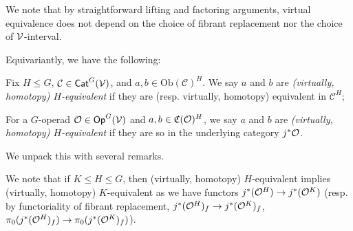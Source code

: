 \documentclass[a4paper,10pt
,draft
]{article}%
\renewcommand{\1}{\eta}%
\begin{document}
\begin{remark}
      \label{VE_CHOICE_REM}
      We note that by straightforward lifting and factoring arguments,
      virtual equivalence does not depend on the choice of fibrant replacement nor the choice of $\mathcal V$-interval.
\end{remark}

Equivariantly, we have the following:
\begin{definition}
      \label{EQUIVG_DEF}
      Fix $H \leq G$, $\mathcal{C}\in \mathsf{Cat}^G(\mathcal V)$, and $a,b\in \mathrm{Ob}(\mathcal{C})^H$.
      We say $a$ and $b$ are 
      \textit{(virtually, homotopy) $H$-equivalent}
      if they are (resp. virtually, homotopy) equivalent in $\mathcal{C}^H$;
      
      For a $G$-operad $\mathcal{O}\in \mathsf{Op}^G(\mathcal V)$ and $a,b\in \mathfrak C(\mathcal{O})^H$, we say $a$ and $b$ are
      {\em (virtually, homotopy) $H$-equivalent}
      if they are so in the underlying category $j^*\mathcal{O}$. 
\end{definition}

We unpack this with several remarks.

\begin{remark}
      \label{HK_EQUIV_REM}
      We note that if $K \leq H \leq G$, then (virtually, homotopy) $H$-equivalent implies (virtually, homotopy) $K$-equivalent
      as we have functors
      $j^{\**}(\O^H) \to j^{\**}(\O^K)$
      (resp. by functoriality of fibrant replacement,
      $j^{\**}(\O^H)_f \to j^{\**}(\O^K)_f$,
      $\pi_0(j^{\**}(\O^H)_f) \to \pi_0(j^{\**}(\O^K)_f)$).
\end{remark}
\end{document}
